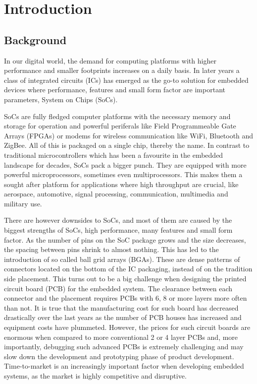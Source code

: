 \section{Introduction}

\subsection{Background}

In our digital world, the demand for computing platforms with higher performance and smaller footprints increases on a daily basis. In later years a class of integrated circuits (ICs) has emerged as the go-to solution for embedded devices where performance, features and small form factor are important parameters, System on Chips (SoCs).

SoCs are fully fledged computer platforms with the necessary memory and storage for operation and powerful periferals like Field Programmeable Gate Arrays (FPGAs) or modems for wireless communication like WiFi, Bluetooth and ZigBee. All of this is packaged on a single chip, thereby the name. In contrast to traditional microcontrollers which has been a favourite in the embedded landscape for decades, SoCs pack a bigger punch. They are equipped with more powerful microprocessors, sometimes even multiprocessors. This makes them a sought after platform for applications where high throughput are crucial, like aerospace, automotive, signal processing, communication, multimedia and military use.

There are however downsides to SoCs, and most of them are caused by the biggest strengths of SoCs, high performance, many features and small form factor. As the number of pins on the SoC package grows and the size decreases, the spacing between pins shrink to almost nothing. This has led to the introduction of so called ball grid arrays (BGAs). These are dense patterns of connectors located on the bottom of the IC packaging, instead of on the tradition side placement. This turns out to be a big challenge when designing the printed circuit board (PCB) for the embedded system. The clearance between each connector and the placement requires PCBs with 6, 8 or more layers more often than not. It is true that the manufacturing cost for such board has decreased drastically over the last years as the number of PCB houses has increased and equipment costs have plummeted. However, the prices for such circuit boards are enormous when compared to more conventional 2 or 4 layer PCBs and, more importantly, debugging such advanced PCBs is extremely challenging and may slow down the development and prototyping phase of product development. Time-to-market is an increasingly important factor when developing embedded systems, as the market is highly competitive and disruptive. 

